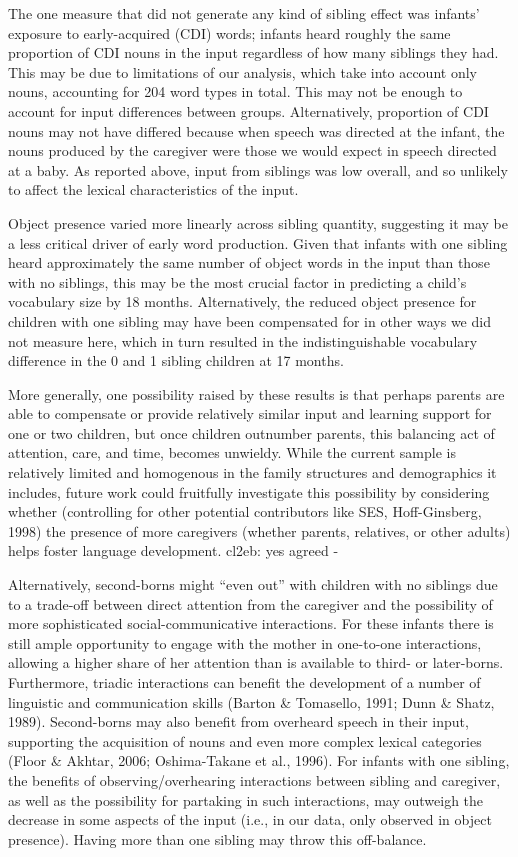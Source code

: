 \documentclass[
  english,
  man,floatsintext]{apa6}
\begin{document}
The one measure that did not generate any kind of sibling effect was infants' exposure to early-acquired (CDI) words; infants heard roughly the same proportion of CDI nouns in the input regardless of how many siblings they had. This may be due to limitations of our analysis, which take into account only nouns, accounting for 204 word types in total. This may not be enough to account for input differences between groups. Alternatively, proportion of CDI nouns may not have differed because when speech was directed at the infant, the nouns produced by the caregiver were those we would expect in speech directed at a baby. As reported above, input from siblings was low overall, and so unlikely to affect the lexical characteristics of the input.

Object presence varied more linearly across sibling quantity, suggesting it may be a less critical driver of early word production. Given that infants with one sibling heard approximately the same number of object words in the input than those with no siblings, this may be the most crucial factor in predicting a child's vocabulary size by 18 months. Alternatively, the reduced object presence for children with one sibling may have been compensated for in other ways we did not measure here, which in turn resulted in the indistinguishable vocabulary difference in the 0 and 1 sibling children at 17 months.

More generally, one possibility raised by these results is that perhaps parents are able to compensate or provide relatively similar input and learning support for one or two children, but once children outnumber parents, this balancing act of attention, care, and time, becomes unwieldy. While the current sample is relatively limited and homogenous in the family structures and demographics it includes, future work could fruitfully investigate this possibility by considering whether (controlling for other potential contributors like SES, Hoff-Ginsberg, 1998) the presence of more caregivers (whether parents, relatives, or other adults) helps foster language development.
cl2eb: yes agreed -

Alternatively, second-borns might \enquote{even out} with children with no siblings due to a trade-off between direct attention from the caregiver and the possibility of more sophisticated social-communicative interactions. For these infants there is still ample opportunity to engage with the mother in one-to-one interactions, allowing a higher share of her attention than is available to third- or later-borns. Furthermore, triadic interactions can benefit the development of a number of linguistic and communication skills (Barton \& Tomasello, 1991; Dunn \& Shatz, 1989). Second-borns may also benefit from overheard speech in their input, supporting the acquisition of nouns and even more complex lexical categories (Floor \& Akhtar, 2006; Oshima-Takane et al., 1996). For infants with one sibling, the benefits of observing/overhearing interactions between sibling and caregiver, as well as the possibility for partaking in such interactions, may outweigh the decrease in some aspects of the input (i.e., in our data, only observed in object presence). Having more than one sibling may throw this off-balance.
\end{document}

